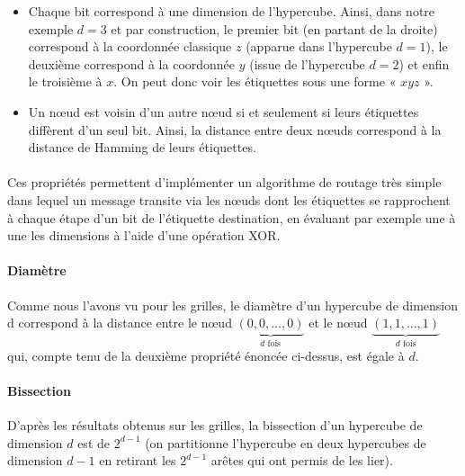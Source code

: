 \begin{itemize}
\item Chaque bit correspond à une dimension de l'hypercube. Ainsi, dans notre exemple $d=3$ et par construction, le premier bit (en partant de la droite) correspond à la coordonnée classique $z$ (apparue dans l'hypercube $d=1$), le deuxième correspond à la coordonnée $y$ (issue de l'hypercube $d=2$) et enfin le troisième à $x$. On peut donc voir les étiquettes sous une forme « $xyz$ ».
\item Un nœud est voisin d'un autre nœud si et seulement si leurs étiquettes diffèrent d'un seul bit. Ainsi, la distance entre deux nœuds correspond à la distance de Hamming de leurs étiquettes.
\end{itemize}

\paragraph{}
Ces propriétés permettent d'implémenter un algorithme de routage très simple dans lequel un message transite via les nœuds dont les étiquettes se rapprochent à chaque étape d'un bit de l'étiquette destination, en évaluant par exemple une à une les dimensions à l'aide d'une opération XOR.

\paragraph{Diamètre} Comme nous l'avons vu pour les grilles, le diamètre d'un hypercube de dimension d correspond à la distance entre le nœud $\underbrace{(0,0,…,0)}_{d \text{ fois}}$ et le nœud $\underbrace{(1,1,…,1)}_{d \text{ fois}}$ qui, compte tenu de la deuxième propriété énoncée ci-dessus, est égale à $d$.

\paragraph{Bissection} D'après les résultats obtenus sur les grilles, la bissection d'un hypercube de dimension $d$ est de $2^{d-1}$ (on partitionne l'hypercube en deux hypercubes de dimension $d-1$ en retirant les $2^{d-1}$ arêtes qui ont permis de les lier).



